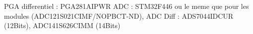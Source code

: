 PGA differentiel : PGA281AIPWR
ADC : STM32F446 ou le meme que pour les modules (ADC121S021CIMF/NOPBCT-ND), 
ADC Diff : ADS7044IDCUR (12Bits), ADC141S626CIMM (14Bits)
